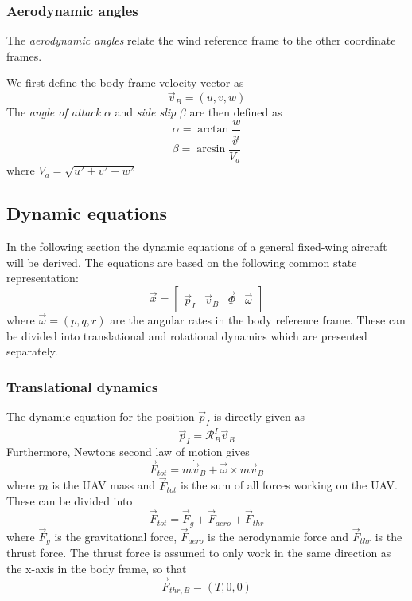 \subsubsection{Aerodynamic angles}
The \textit{aerodynamic angles} relate the wind reference frame to the other coordinate frames.

\begin{definition}
We first define the body frame velocity vector as 
\begin{equation}
    \vec{v}_B=(u, v, w)
\end{equation}
The \textit{angle of attack} $\alpha$ and \textit{side slip} $\beta$ are then defined as
\begin{equation}
    \alpha=\arctan\frac{w}{u}
\end{equation}
\begin{equation}
    \beta=\arcsin\frac{v}{V_a}
\end{equation}
where $V_a=\sqrt{u^2+v^2+w^2}$
\end{definition}


\subsection{Dynamic equations}
In the following section the dynamic equations of a general fixed-wing aircraft will be derived. The 
equations are based on the following common state representation:
\begin{equation}
    \vec{x}=
    \begin{bmatrix}
        \vec{p}_I & \vec{v}_B & \vec{\Phi} & \vec{\omega}
    \end{bmatrix}
\end{equation}
where $\vec{\omega}=(p, q, r)$ are the angular rates in the body reference frame. These can be divided
into translational and rotational dynamics which are presented separately.
\subsubsection{Translational dynamics}
The dynamic equation for the position $\vec{p}_I$ is directly given as
\begin{equation}\label{eq:dynamic_first}
    \dot{\vec{p}}_I=\mathcal{R}^I_B\vec{v}_B
\end{equation}
Furthermore, Newtons second law of motion gives 
\begin{equation}\label{eq:uav_force}
    \vec{F}_{tot}=m\dot{\vec{v}}_B + \vec{\omega}\times m\vec{v}_B 
\end{equation}
where $m$ is the UAV mass and $\vec{F}_{tot}$ is the sum of all forces working on the UAV.
These can be divided into
\begin{equation}
    \vec{F}_{tot}=\vec{F}_g+\vec{F}_{aero}+\vec{F}_{thr}
\end{equation}
where $\vec{F}_g$ is the gravitational force, $\vec{F}_{aero}$ is the aerodynamic force and
$\vec{F}_{thr}$ is the thrust force. The thrust force is assumed to only work in the same direction
as the x-axis in the body frame, so that
\begin{equation}
    \vec{F}_{thr, B}=(T, 0, 0)
\end{equation}

